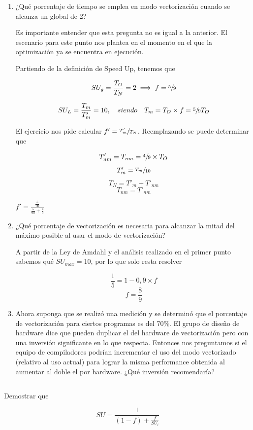 \begin{enumerate}
 \item ¿Qué porcentaje de tiempo se emplea en modo vectorización cuando se alcanza un \SU global de 2?

 Es importante entender que esta pregunta no es igual a la anterior. El escenario para este punto nos plantea en el momento en el que 
 la optimización ya se encuentra en ejecución.

 Partiendo de la definición de Speed Up, tenemos que 

 $$ SU_g = \frac{T_O}{T_N} = 2 \implies f = \sfrac{5}{9} $$

 $$ SU_L = \frac{T_m}{T'_m} = 10,\quad siendo \quad T_m = T_O \times f = \sfrac{5}{9}T_O $$

 El ejercicio nos pide calcular $ f' = \sfrac{T'_m}{T_N} $. Reemplazando se puede determinar que
 
 $$ T'_{nm} = T_{nm} = \sfrac{4}{9} \times T_O $$
 $$ T'_m =  \sfrac{T_m}{10} $$ 
 $$ T_N = T'_{m} + T'_{nm} $$
 $$ T_{nm} = T'_{nm} $$ 
 
 $ f' = \frac{\frac{5}{90}}{\frac{5}{90} + \frac{4}{9}} $
 
 \item ¿Qué porcentaje de vectorización es necesaria para alcanzar la mitad del máximo \SU posible al usar el modo de vectorización?

 A partir de la Ley de Amdahl y el análisis realizado en el primer punto sabemos qué $SU_{max} = 10$, por lo que solo resta resolver

 $$ \frac{1}{5} = 1 - 0,9 \times f $$
 $$ f = \frac{8}{9} $$ 
 
 \item Ahora suponga que se realizó una medición y se determinó que el porcentaje de vectorización para ciertos programas es del 70\%. El grupo de diseño de hardware dice que pueden duplicar el \SU del hardware de vectorización pero con una inversión significante en lo que respecta. Entonces nos preguntamos si el equipo de compiladores podrían incrementar el uso del modo vectorizado (relativo al uso actual) para lograr la misma performance obtenida al aumentar al doble el \SU por hardware. ¿Qué inversión recomendaría?  

\end{enumerate}


\subsection{}
Demostrar que 

						 $$ SU = \frac {1} {(1-f) + \frac {f}{SU_l}} $$


